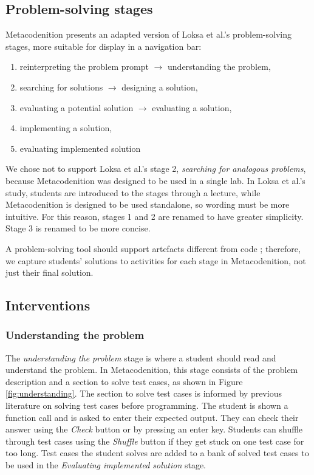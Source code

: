 \documentclass[sigconf,authorversion,nonacm]{acmart}
\begin{document}
\subsection{Problem-solving stages}
Metacodenition presents an adapted version of Loksa et al.'s problem-solving stages, more suitable for display in a navigation bar:
\begin{enumerate}
    \item reinterpreting the problem prompt \(\rightarrow \) understanding the problem,
    \item searching for solutions \(\rightarrow \) designing a solution,
    \item evaluating a potential solution \(\rightarrow \) evaluating a solution,
    \item implementing a solution,
    \item evaluating implemented solution
\end{enumerate}

We chose not to support Loksa et al.'s stage 2, \emph{searching for analogous problems}, because Metacodenition was designed to be used in a single lab. In Loksa et al.'s study, students are introduced to the stages through a lecture, while Metacodenition is designed to be used standalone, so wording must be more intuitive. For this reason, stages 1 and 2 are renamed to have greater simplicity. Stage 3 is renamed to be more concise.

A problem-solving tool should support artefacts different from code \cite{saenz2022}; therefore, we capture students' solutions to activities for each stage in Metacodenition, not just their final solution.

\subsection{Interventions}
\subsubsection{Understanding the problem}
The \emph{understanding the problem} stage is where a student should read and understand the problem. In Metacodenition, this stage consists of the problem description and a section to solve test cases, as shown in Figure \ref{fig:understanding}. The section to solve test cases is informed by previous literature on solving test cases before programming. The student is shown a function call and is asked to enter their expected output. They can check their answer using the \emph{Check} button or by pressing an enter key. Students can shuffle through test cases using the \emph{Shuffle} button if they get stuck on one test case for too long. Test cases the student solves are added to a bank of solved test cases to be used in the \emph{Evaluating implemented solution} stage.
\end{document}
